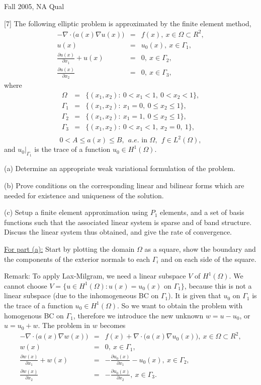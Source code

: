 \documentclass[12pt]{article}
\begin{document}
 

Fall 2005, NA Qual 

[7] The following elliptic problem is approximated by the finite 
element method,
\begin{eqnarray*}
-\nabla\cdot \Big(a(x)\nabla u(x)\Big)&=&f(x),\ x\in \Omega\subset R^2,\\
u(x)&=&u_0(x),\ x\in \Gamma_1,\\
\frac{\partial u(x)}{\partial x_1}+u(x)&=&0, \ x\in \Gamma_2,\\
\frac{\partial u(x)}{\partial x_2}&=&0,\ x\in\Gamma_3,
\end{eqnarray*}
where 
\begin{eqnarray*}
\Omega&=&\{(x_1,x_2): \ 0<x_1<1,\ 0<x_2<1\},\\
\Gamma_1&=&\{(x_1,x_2): \ x_1=0,\ 0\leq x_2\leq1\},\\
\Gamma_2&=&\{(x_1,x_2): \ x_1=1,\ 0\leq x_2\leq1\},\\
\Gamma_3&=&\{(x_1,x_2): \ 0<x_1<1,\ x_2=0,\ 1\},\\
\end{eqnarray*}
$$0<A\leq a(x)\leq B,\ \ a.e. \mbox{ in }\Omega,\ \ f\in L^2(\Omega),$$
and $u_0|_{\Gamma_1}$ is the trace of a function $u_0\in H^1(\Omega)$. 

(a) Determine an appropriate weak variational formulation of the problem. 

(b) Prove conditions on the corresponding linear and bilinear forms which are 
needed for existence and uniqueness of the solution. 

(c) Setup a finite element approximation using $P_1$ elements, and a set of 
basis functions such that the associated linear system 
is sparse and of band structure. Discuss the linear system thus 
obtained, and give the rate of convergence. 

\underline{For part (a):} Start by plotting the domain $\Omega$ as a square, show the boundary and the components of the exterior normals to each $\Gamma_i$ and on each side of the square. 

Remark: To apply Lax-Milgram, we need a linear subspace $V$ of $H^1(\Omega)$. We cannot choose $V=\{u\in H^1(\Omega): u(x)=u_0(x) \mbox{ on } \Gamma_1\}$, because this is not a linear subspace (due to the inhomogeneous BC on $\Gamma_1$). It is given that $u_0$ on $\Gamma_1$
is the trace of a function $u_0\in H^1(\Omega)$. So we want to obtain the problem with homogenous BC on $\Gamma_1$, therefore we introduce the new unknown 
$w=u-u_0$, or $u=u_0+w$. The problem in $w$ becomes 
\begin{eqnarray*}
-\nabla\cdot \Big(a(x)\nabla w(x)\Big)&=&f(x)+\nabla\cdot \Big(a(x)\nabla u_0(x)\Big),\ x\in \Omega\subset R^2,\\
w(x)&=&0,\ x\in \Gamma_1,\\
\frac{\partial w(x)}{\partial x_1}+w(x)&=&-\frac{\partial u_0(x)}{\partial x_1}-u_0(x), \ x\in \Gamma_2,\\
\frac{\partial w(x)}{\partial x_2}&=&-\frac{\partial u_0(x)}{\partial x_2},\ x\in\Gamma_3.
\end{eqnarray*}
\end{document}
